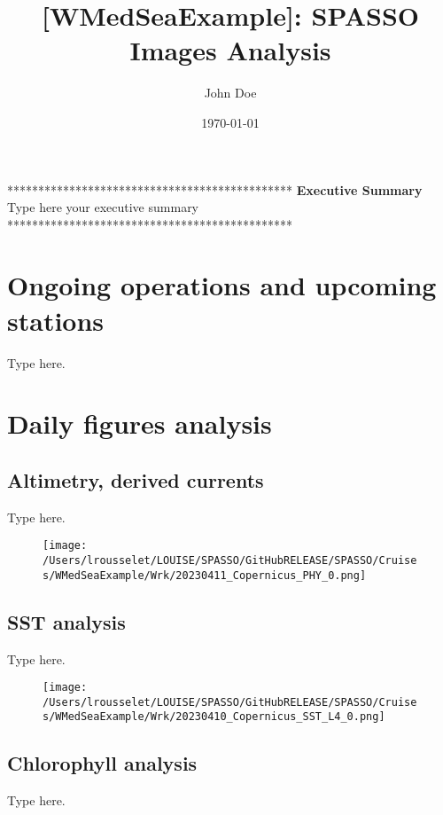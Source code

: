 \documentclass{article}%
\title{{[}WMedSeaExample{]}: SPASSO Images Analysis}%
\author{John Doe}%
\date{\today}%
\begin{document}
%
\normalsize%
\maketitle%
\begin{center}%
**********************************************%
\textbf{\newline%
Executive Summary}%
\newline%
\newline%
 Type here your executive summary\newline%
%
**********************************************%
\end{center}%
\section{Ongoing operations and upcoming stations}%
\label{sec:Ongoingoperationsandupcomingstations}%
Type here.

%
\section{Daily figures analysis}%
\label{sec:Dailyfiguresanalysis}%
\subsection{Altimetry, derived currents}%
\label{subsec:Altimetry,derivedcurrents}%
Type here.%


\begin{figure}[h!]%
\centering%
\texttt{[image: /Users/lrousselet/LOUISE/SPASSO/GitHubRELEASE/SPASSO/Cruises/WMedSeaExample/Wrk/20230411\_Copernicus\_PHY\_0.png]}%
\end{figure}

%
\clearpage

%
\subsection{SST analysis}%
\label{subsec:SSTanalysis}%
Type here.%


\begin{figure}[h!]%
\centering%
\texttt{[image: /Users/lrousselet/LOUISE/SPASSO/GitHubRELEASE/SPASSO/Cruises/WMedSeaExample/Wrk/20230410\_Copernicus\_SST\_L4\_0.png]}%
\end{figure}

%
\clearpage

%
\subsection{Chlorophyll analysis}%
\label{subsec:Chlorophyllanalysis}%
Type here.%
\end{document}
